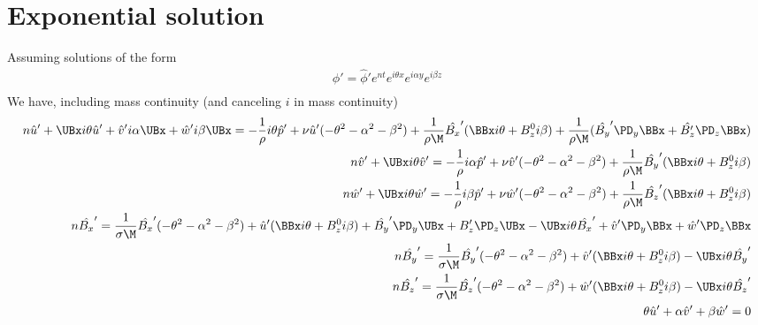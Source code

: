 \documentclass[11pt]{article}
\begin{document}
\section{Exponential solution}
Assuming solutions of the form
\begin{equation}\begin{aligned}
\phi' = \hat{\phi}' e^{nt} e^{i \theta x} e^{i \alpha y} e^{i \beta z} \\
\end{aligned} \end{equation}
We have, including mass continuity (and canceling $i$ in mass continuity)
\begin{equation}\begin{aligned}
n \hat{u}'+ \UBx i\theta \hat{u}' + \hat{v}' i \alpha \UBx  + \hat{w}' i \beta \UBx = -\frac{1}{\rho} i \theta \hat{p}'+ \nu \hat{u}' (-\theta^2 -\alpha^2 - \beta^2) + \frac{1}{\rho \M} \hat{B_x}' (\BBx i\theta + B_z^0 i\beta) + \frac{1}{\rho \M} (\hat{B_y}' \PD_y \BBx + \hat{B_z'} \PD_z \BBx) \\
n \hat{v}'+ \UBx i\theta \hat{v}'                                                   = -\frac{1}{\rho} i \alpha \hat{p}'+ \nu \hat{v}' (-\theta^2 -\alpha^2 - \beta^2) + \frac{1}{\rho \M} \hat{B_y}' (\BBx i\theta + B_z^0 i\beta) \\
n \hat{w}'+ \UBx i\theta \hat{w}'                                                   = -\frac{1}{\rho} i \beta  \hat{p}'+ \nu \hat{w}' (-\theta^2 -\alpha^2 - \beta^2) + \frac{1}{\rho \M} \hat{B_z}' (\BBx i\theta + B_z^0 i\beta) \\
n \hat{B_x}' = \frac{1}{\sigma \M} \hat{B_x}' (-\theta^2 -\alpha^2 -\beta^2) + \hat{u}'(\BBx i\theta +B_z^0 i\beta) +\hat{B_y}'\PD_y \UBx +B_z'\PD_z \UBx - \UBx i\theta \hat{B_x}'+\hat{v}'\PD_y \BBx +\hat{w}'\PD_z \BBx \\
n \hat{B_y}' = \frac{1}{\sigma \M} \hat{B_y}' (-\theta^2 -\alpha^2 -\beta^2) + \hat{v}'(\BBx i\theta +B_z^0 i\beta)                                       - \UBx i\theta \hat{B_y}'                                        \\
n \hat{B_z}' = \frac{1}{\sigma \M} \hat{B_z}' (-\theta^2 -\alpha^2 -\beta^2) + \hat{w}'(\BBx i\theta +B_z^0 i\beta)                                       - \UBx i\theta \hat{B_z}'                                        \\
 \theta \hat{u}' +  \alpha \hat{v}' +  \beta \hat{w}' = 0 \\
\end{aligned} \end{equation}
\end{document}
